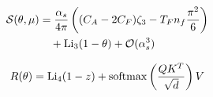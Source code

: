 \begin{align}
  \mathcal{S}(\theta, \mu) &= \frac{\alpha_s}{4\pi} \left( (C_A - 2C_F) \zeta_{3} - T_F n_f \frac{\pi^2}{6} \right) \nonumber \\
  &\quad + \mathrm{Li}_{3}(1 - \theta) + \mathcal{O}(\alpha_s^3) \label{eq:3}
\end{align}

\begin{equation}
  R(\theta) = \mathrm{Li}_{4}(1 - z) + \mathrm{softmax}\left(\frac{Q K^T}{\sqrt{d}}\right) V
  \label{eq:4}
\end{equation}

